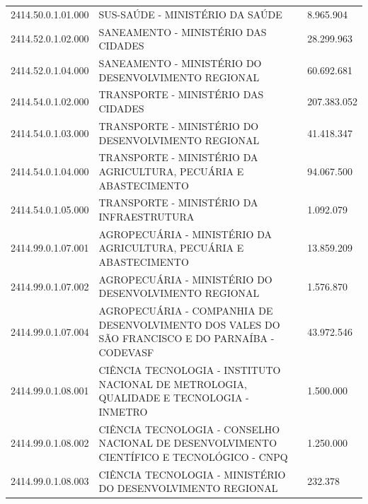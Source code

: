 \documentclass{article}
\begin{document}
\begin{longtable}[c]{m{2cm}|m{13cm}|m{2cm}}
\multicolumn{1}{C{2cm}|}{2414.50.0.1.01.000} & \multicolumn{1}{L{13cm}|}{SUS-SAÚDE - MINISTÉRIO DA SAÚDE} & \multicolumn{1}{R{2cm}}{8.965.904} \\
\multicolumn{1}{C{2cm}|}{2414.52.0.1.02.000} & \multicolumn{1}{L{13cm}|}{SANEAMENTO - MINISTÉRIO DAS CIDADES} & \multicolumn{1}{R{2cm}}{28.299.963} \\
\multicolumn{1}{C{2cm}|}{2414.52.0.1.04.000} & \multicolumn{1}{L{13cm}|}{SANEAMENTO - MINISTÉRIO DO DESENVOLVIMENTO REGIONAL} & \multicolumn{1}{R{2cm}}{60.692.681} \\
\multicolumn{1}{C{2cm}|}{2414.54.0.1.02.000} & \multicolumn{1}{L{13cm}|}{TRANSPORTE - MINISTÉRIO DAS CIDADES} & \multicolumn{1}{R{2cm}}{207.383.052} \\
\multicolumn{1}{C{2cm}|}{2414.54.0.1.03.000} & \multicolumn{1}{L{13cm}|}{TRANSPORTE - MINISTÉRIO DO DESENVOLVIMENTO REGIONAL} & \multicolumn{1}{R{2cm}}{41.418.347} \\
\multicolumn{1}{C{2cm}|}{2414.54.0.1.04.000} & \multicolumn{1}{L{13cm}|}{TRANSPORTE - MINISTÉRIO DA AGRICULTURA, PECUÁRIA E ABASTECIMENTO} & \multicolumn{1}{R{2cm}}{94.067.500} \\
\multicolumn{1}{C{2cm}|}{2414.54.0.1.05.000} & \multicolumn{1}{L{13cm}|}{TRANSPORTE - MINISTÉRIO DA INFRAESTRUTURA} & \multicolumn{1}{R{2cm}}{1.092.079} \\
\multicolumn{1}{C{2cm}|}{2414.99.0.1.07.001} & \multicolumn{1}{L{13cm}|}{AGROPECUÁRIA - MINISTÉRIO DA AGRICULTURA, PECUÁRIA E ABASTECIMENTO} & \multicolumn{1}{R{2cm}}{13.859.209} \\
\multicolumn{1}{C{2cm}|}{2414.99.0.1.07.002} & \multicolumn{1}{L{13cm}|}{AGROPECUÁRIA - MINISTÉRIO DO DESENVOLVIMENTO REGIONAL} & \multicolumn{1}{R{2cm}}{1.576.870} \\
\multicolumn{1}{C{2cm}|}{2414.99.0.1.07.004} & \multicolumn{1}{L{13cm}|}{AGROPECUÁRIA - COMPANHIA DE DESENVOLVIMENTO DOS VALES DO SÃO FRANCISCO E DO PARNAÍBA - CODEVASF} & \multicolumn{1}{R{2cm}}{43.972.546} \\
\multicolumn{1}{C{2cm}|}{2414.99.0.1.08.001} & \multicolumn{1}{L{13cm}|}{CIÊNCIA TECNOLOGIA - INSTITUTO NACIONAL DE METROLOGIA, QUALIDADE E TECNOLOGIA - INMETRO} & \multicolumn{1}{R{2cm}}{1.500.000} \\
\multicolumn{1}{C{2cm}|}{2414.99.0.1.08.002} & \multicolumn{1}{L{13cm}|}{CIÊNCIA TECNOLOGIA - CONSELHO NACIONAL DE DESENVOLVIMENTO CIENTÍFICO E TECNOLÓGICO - CNPQ} & \multicolumn{1}{R{2cm}}{1.250.000} \\
\multicolumn{1}{C{2cm}|}{2414.99.0.1.08.003} & \multicolumn{1}{L{13cm}|}{CIÊNCIA TECNOLOGIA - MINISTÉRIO DO DESENVOLVIMENTO REGIONAL} & \multicolumn{1}{R{2cm}}{232.378} \\

\end{longtable}
\end{document}
